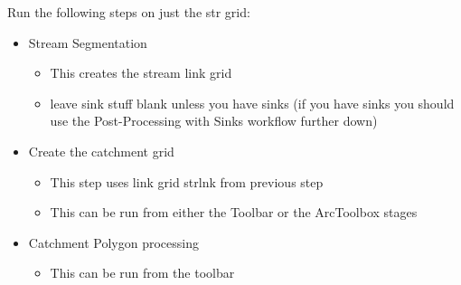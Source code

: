 \documentclass[letterpaper,10pt,english]{sphinxmanual}
\begin{document}
 Run the following steps on just the str grid:
\begin{itemize}
\item {} 
Stream Segmentation
\begin{itemize}
\item {} 
This creates the stream link grid

\item {} 
leave sink stuff blank unless you have sinks (if you have sinks you should use the Post-Processing with Sinks workflow further down)

\end{itemize}

\end{itemize}
\begin{itemize}
\item {} 
Create the catchment grid
\begin{itemize}
\item {} 
This step uses link grid strlnk from previous step

\item {} 
This can be run from either the Toolbar or the ArcToolbox stages

\end{itemize}

\end{itemize}
\begin{itemize}
\item {} 
Catchment Polygon processing
\begin{itemize}
\item {} 
This can be run from the toolbar

\end{itemize}

\end{itemize}
\end{document}
